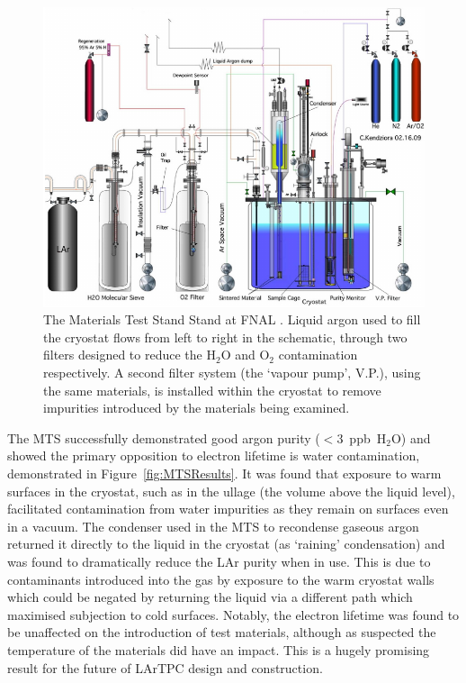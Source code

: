 \begin{figure}
  \centering
  \includegraphics[width=14cm]{MTS.pdf}
  \caption[The Materials Test Stand Stand at FNAL.]{The Materials Test Stand Stand at FNAL \cite{MTS2009b}.  Liquid argon used to fill the cryostat flows from left to right in the schematic, through two filters designed to reduce the H$_2$O and O$_2$ contamination respectively.  A second filter system (the `vapour pump', V.P.), using the same materials, is installed within the cryostat to remove impurities introduced by the materials being examined.}
  \label{fig:MTS}
\end{figure}

The MTS successfully demonstrated good argon purity ($<3$~ppb~H$_2$O) and showed the primary opposition to electron lifetime is water contamination, demonstrated in Figure~\ref{fig:MTSResults}.  It was found that exposure to warm surfaces in the cryostat, such as in the ullage (the volume above the liquid level), facilitated contamination from water impurities as they remain on surfaces even in a vacuum.  The condenser used in the MTS to recondense gaseous argon returned it directly to the liquid in the cryostat (as `raining' condensation) and was found to dramatically reduce the LAr purity when in use.  This is due to contaminants introduced into the gas by exposure to the warm cryostat walls which could be negated by returning the liquid via a different path which maximised subjection to cold surfaces.  Notably, the electron lifetime was found to be unaffected on the introduction of test materials, although as suspected the temperature of the materials did have an impact.  This is a hugely promising result for the future of LArTPC design and construction.

